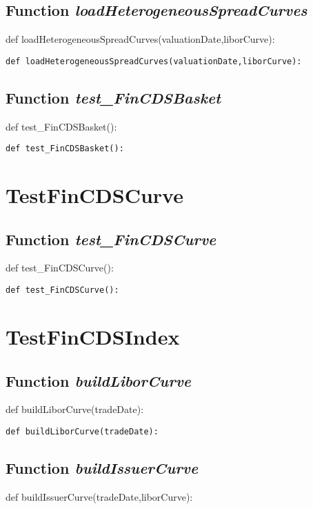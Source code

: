 \documentclass[twoside,11pt]{book}
\begin{document}
\subsection{Function {\it loadHeterogeneousSpreadCurves}}
def loadHeterogeneousSpreadCurves(valuationDate,liborCurve):

\begin{lstlisting}
def loadHeterogeneousSpreadCurves(valuationDate,liborCurve):
\end{lstlisting}

\subsection{Function {\it test\_FinCDSBasket}}
def test\_FinCDSBasket():

\begin{lstlisting}
def test_FinCDSBasket():
\end{lstlisting}


\newpage
\section{TestFinCDSCurve}

\subsection{Function {\it test\_FinCDSCurve}}
def test\_FinCDSCurve():

\begin{lstlisting}
def test_FinCDSCurve():
\end{lstlisting}


\newpage
\section{TestFinCDSIndex}

\subsection{Function {\it buildLiborCurve}}
def buildLiborCurve(tradeDate):

\begin{lstlisting}
def buildLiborCurve(tradeDate):
\end{lstlisting}

\subsection{Function {\it buildIssuerCurve}}
def buildIssuerCurve(tradeDate,liborCurve):
\end{document}
